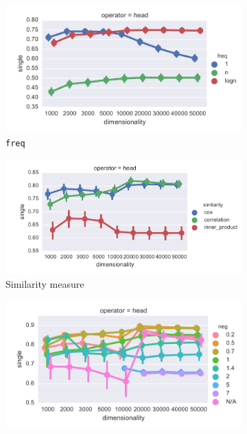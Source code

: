\begin{figure}[b]
  \centering

  \begin{subfigure}[t]{0.49\textwidth}
  \includegraphics[width=\textwidth]{supplement/figures/single-interaction-freq}

  \caption{\texttt{freq}}
  \label{fig:single-freq}
  \end{subfigure}
  \begin{subfigure}[t]{0.49\textwidth}

  \includegraphics[width=1.1\textwidth]{supplement/figures/single-interaction-similarity}

  \caption{Similarity measure}
  \label{fig:single-similarity}
  \end{subfigure}

  \begin{subfigure}[t]{0.49\textwidth}

  \includegraphics[width=\textwidth]{supplement/figures/single-interaction-neg}


\end{subfigure}
\end{figure}
